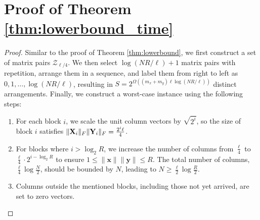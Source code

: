 \section{Proof of Theorem \ref{thm:lowerbound_time}}\label{apdx:lowerbound_time}

\begin{proof}
    Similar to the proof of Theorem \ref{thm:lowerbound}, we first construct a set of matrix pairs \( \mathcal{Z}_{\ell/4} \). We then select \( \log{(NR/\ell)} +1\) matrix pairs with repetition, arrange them in a sequence, and label them from right to left as \( 0, 1, \dots, \log{(NR/\ell)} \), resulting in \( S = 2^{\Omega((m_x + m_y)\ell \log{(NR/\ell)})} \) distinct arrangements. Finally, we construct a worst-case instance using the following steps:
    \begin{enumerate}
        \item For each block \( i \), we scale the unit column vectors by \( \sqrt{2^i} \), so the size of block \( i \) satisfies \( \|{\bf X}_{i}\|_F \|{\bf Y}_{i}\|_F = \frac{2^i \ell}{4} \).
        
        \item For blocks where \( i > \log_2{R} \), we increase the number of columns from \( \frac{\ell}{4} \) to \( \frac{\ell}{4} \cdot 2^{i - \log_2{R}} \) to ensure \( 1 \leq \|\mathbf{x}\| \|\mathbf{y}\| \leq R \). The total number of columns, \( \frac{\ell}{4} \log{\frac{N}{2}} \), should be bounded by \( N \), leading to \( N \geq \frac{\ell}{2} \log{\frac{R}{2}} \).
        
        \item Columns outside the mentioned blocks, including those not yet arrived, are set to zero vectors.
    \end{enumerate}


\end{proof}
